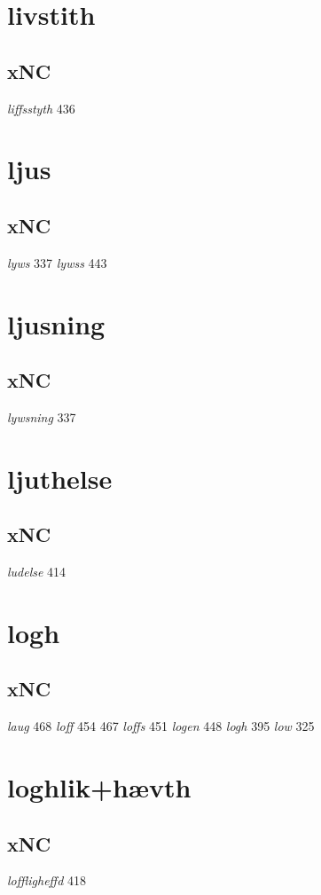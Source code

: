 \documentclass[a4paper,twocolumn]{article}
\begin{document}
\section{livstith}
\label{sec:org578f9b7}
\subsection{xNC}
\label{sec:org2845e5c}
\emph{liffsstyth} 436 
\section{ljus}
\label{sec:org67d1383}
\subsection{xNC}
\label{sec:org31d4db7}
\emph{lyws} 337 \emph{lywss} 443 
\section{ljusning}
\label{sec:orgc469b10}
\subsection{xNC}
\label{sec:org59233c5}
\emph{lywsning} 337 
\section{ljuthelse}
\label{sec:org0667110}
\subsection{xNC}
\label{sec:org0a523c0}
\emph{ludelse} 414 
\section{logh}
\label{sec:orgbb7dbf0}
\subsection{xNC}
\label{sec:orgefd846f}
\emph{laug} 468 \emph{loff} 454 467 \emph{loffs} 451 \emph{logen} 448 \emph{logh} 395 \emph{low} 325 
\section{loghlik+hævth}
\label{sec:org91540b4}
\subsection{xNC}
\label{sec:orga8736f4}
\emph{loffligheffd} 418 
\end{document}

